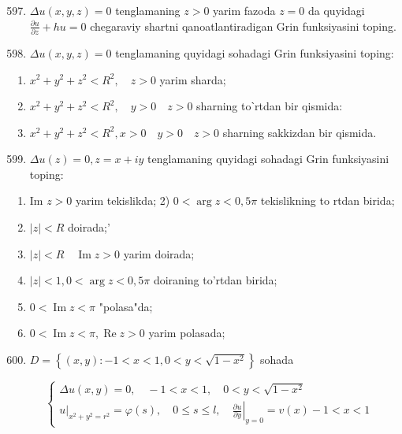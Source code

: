 \documentclass[10pt]{article}
\begin{document}
\begin{enumerate}
  \setcounter{enumi}{596}
  \item $\Delta u(x, y, z)=0$ tenglamaning $z>0$ yarim fazoda $z=0$ da quyidagi $\frac{\partial u}{\partial z}+h u=0$ chegaraviy shartni qanoatlantiradigan Grin funksiyasini toping.
  \item $\Delta u(x, y, z)=0$ tenglamaning quyidagi sohadagi Grin funksiyasini toping:
\end{enumerate}

\begin{enumerate}
  \item $x^{2}+y^{2}+z^{2}<R^{2}, \quad z>0$ yarim sharda;
  \item $x^{2}+y^{2}+z^{2}<R^{2}, \quad y>0 \quad z>0$ sharning toˋrtdan bir qismida:
  \item $x^{2}+y^{2}+z^{2}<R^{2}, x>0 \quad y>0 \quad z>0$ sharning sakkizdan bir qismida.
\end{enumerate}

\begin{enumerate}
  \setcounter{enumi}{598}
  \item $\Delta u(z)=0, z=x+i y$ tenglamaning quyidagi sohadagi Grin funksiyasini toping:
\end{enumerate}

\begin{enumerate}
  \item Im $z>0$ yarim tekislikda; 2) $0<\arg z<0,5 \pi$ tekislikning to rtdan birida;
  \item $|z|<R$ doirada;'
  \item $|z|<R \quad \operatorname{Im} z>0$ yarim doirada;
  \item $|z|<1,0<\arg z<0,5 \pi$ doiraning to'rtdan birida;
  \item $0<\operatorname{Im} z<\pi$ "polasa"da;
  \item $0<\operatorname{Im} z<\pi, \operatorname{Re} z>0$ yarim polasada;
\end{enumerate}

\begin{enumerate}
  \setcounter{enumi}{599}
  \item $D=\left\{(x, y):-1<x<1,0<y<\sqrt{1-x^{2}}\right\}$ sohada
\end{enumerate}

$$
\left\{\begin{array}{l}
\Delta u(x, y)=0, \quad-1<x<1, \quad 0<y<\sqrt{1-x^{2}} \\
\left.u\right|_{x^{2}+y^{2}=r^{2}}=\varphi(s), \quad 0 \leq s \leq l,\left.\quad \frac{\partial u}{\partial y}\right|_{y=0}=v(x)-1<x<1
\end{array}\right.
$$
\end{document}
